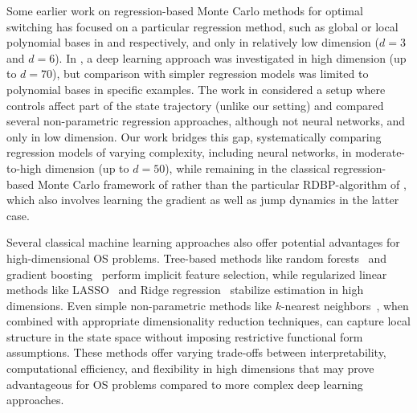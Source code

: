 \documentclass[11pt,reqno,a4paper]{amsart}
\theoremstyle{definition}
\numberwithin{equation}{section}
\DeclareMathOperator{\1}{\mathbbm{1}}
\begin{document}
Some earlier work on regression-based Monte Carlo methods for optimal switching has focused on a particular regression method, such as global or local polynomial bases in \cite{carmona2008pricing} and \cite{ACLP12} respectively, and only in relatively low dimension ($d=3$ and $d = 6$). In \cite{bayraktar2023neural}, a deep learning approach was investigated in high dimension (up to $d=70$), but comparison with simpler regression models was limited to polynomial bases in specific examples. The work in \cite{ludkovski2020simulation} considered a setup where controls affect part of the state trajectory (unlike our setting) and compared several non-parametric regression approaches, although not neural networks, and only in low dimension. Our work bridges this gap, systematically comparing regression models of varying complexity, including neural networks, in moderate-to-high dimension (up to $d = 50$), while remaining in the classical regression-based Monte Carlo framework of \cite{carmona2008pricing} rather than the particular RDBP-algorithm of \cite{hure2020deep,bayraktar2023neural}, which also involves learning the gradient as well as jump dynamics in the latter case.

Several classical machine learning approaches also offer potential advantages for high-dimensional OS problems. Tree-based methods like random forests~\cite{breiman2001random} and gradient boosting~\cite{friedman2001greedy,ke2017lightgbm} perform implicit feature selection, while regularized linear methods like LASSO~\cite{tibshirani1996regression} and Ridge regression~\cite{hoerl1970ridge} stabilize estimation in high dimensions. Even simple non-parametric methods like $k$-nearest neighbors~\cite{cover1967nearest}, when combined with appropriate dimensionality reduction techniques, can capture local structure in the state space without imposing restrictive functional form assumptions. These methods offer varying trade-offs between interpretability, computational efficiency, and flexibility in high dimensions that may prove advantageous for OS problems compared to more complex deep learning approaches.
\end{document}
